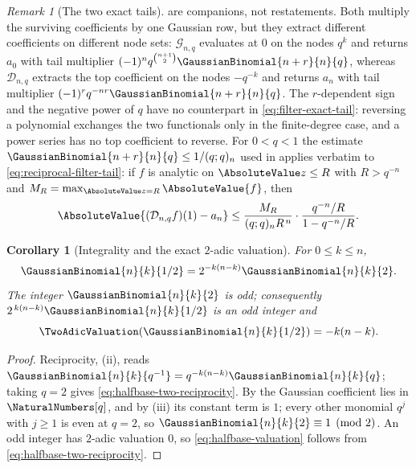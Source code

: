 \documentclass[11pt,a4paper,oneside,openany]{book}
\newtheorem{corollary}[corollary]{Corollary}
\theoremstyle{definition}
\theoremstyle{remark}
\newtheorem{remark}[remark]{Remark}
\begin{document}
\begin{remark}[The two exact tails]\label{rem:two-exact-tails}
 are companions, not restatements.  Both multiply the surviving coefficients by one Gaussian row, but they extract different coefficients on different node sets: $\mathcal G_{n,q}$ evaluates at $0$ on the nodes $q^k$ and returns $a_0$ with tail multiplier $(-1)^nq^{\binom{n+1}{2}}\GaussianBinomial{n+r}{n}{q}$, whereas $\mathcal D_{n,q}$ extracts the top coefficient on the nodes $-q^{-k}$ and returns $a_n$ with tail multiplier $(-1)^rq^{-nr}\GaussianBinomial{n+r}{n}{q}$.  The $r$-dependent sign and the negative power of $q$ have no counterpart in \eqref{eq:filter-exact-tail}: reversing a polynomial exchanges the two functionals only in the finite-degree case, and a power series has no top coefficient to reverse.  For $0<q<1$ the estimate $\GaussianBinomial{n+r}{n}{q}\le1/(q;q)_n$ used in  applies verbatim to \eqref{eq:reciprocal-filter-tail}: if $f$ is analytic on $\AbsoluteValue z\le R$ with $R>q^{-n}$ and $M_R=\max_{\AbsoluteValue z=R}\AbsoluteValue{f}$, then
\[
 \AbsoluteValue{(\mathcal D_{n,q}f)(1)-a_n}
 \le\frac{M_R}{(q;q)_nR^{\,n}}\cdot
    \frac{q^{-n}/R}{1-q^{-n}/R}.
\]
\end{remark}

\begin{corollary}[Integrality and the exact $2$-adic valuation]\label{cor:halfbase-gaussian-valuation}
For $0\le k\le n$,
\begin{equation}\label{eq:halfbase-two-reciprocity}
 \GaussianBinomial{n}{k}{1/2}=2^{-k(n-k)}\GaussianBinomial{n}{k}{2} .
\end{equation}
The integer $\GaussianBinomial{n}{k}{2}$ is odd; consequently $2^{\,k(n-k)}\GaussianBinomial{n}{k}{1/2}$ is an odd integer and
\begin{equation}\label{eq:halfbase-valuation}
 \TwoAdicValuation\!\left(\GaussianBinomial{n}{k}{1/2}\right)=-k(n-k).
\end{equation}
\end{corollary}

\begin{proof}
Reciprocity, (ii), reads $\GaussianBinomial{n}{k}{q^{-1}}=q^{-k(n-k)}\GaussianBinomial{n}{k}{q}$; taking $q=2$ gives \eqref{eq:halfbase-two-reciprocity}.  By  the Gaussian coefficient lies in $\NaturalNumbers[q]$, and by (iii) its constant term is $1$; every other monomial $q^j$ with $j\ge1$ is even at $q=2$, so $\GaussianBinomial{n}{k}{2}\equiv1\pmod2$.  An odd integer has $2$-adic valuation $0$, so \eqref{eq:halfbase-valuation} follows from \eqref{eq:halfbase-two-reciprocity}.
\end{proof}
\end{document}
